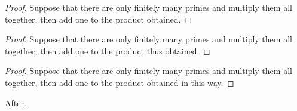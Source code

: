 \documentclass{article}
\begin{document}
\begin{proof}
Suppose that there are only finitely many primes and multiply them all together, then add one to the product obtained.
\end{proof}
\begin{proof}
Suppose that there are only finitely many primes and multiply them all together, then add one to the product thus obtained.
\end{proof}
\begin{proof}
Suppose that there are only finitely many primes and multiply them all together, then add one to the product obtained in this way.
\end{proof}
After.
\end{document}
